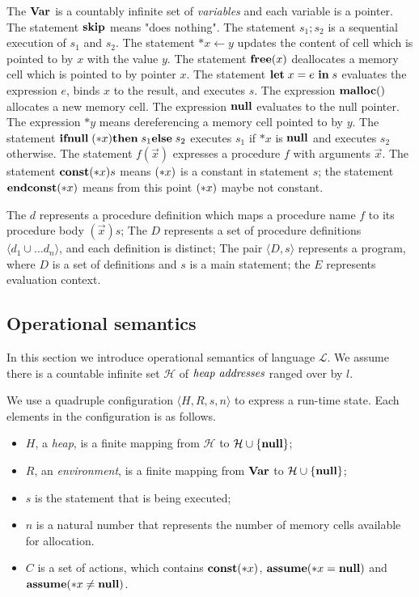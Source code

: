 The \(\mathbf{Var}\) is a countably infinite set of \emph{variables} and each
variable is a pointer. The statement \(\mathbf{skip}\) means "does nothing".
The statement \(s_1;s_2\) is a sequential execution of \(s_1\) and
\(s_2\). The statement \(*x \leftarrow y\) updates the content of cell
which is pointed to by \(x\) with the value \(y\). The statement
\(\mathbf{free}(x)\) deallocates a memory cell which is pointed to by pointer
\(x\). The statement \(\mathbf{let}\; x = e\ \mathbf{in}\; s\) evaluates the expression
\(e\), binds \(x\) to the result, and executes \(s\). The expression
\(\mathbf{malloc}()\) allocates a new memory cell. The expression \(\mathbf{null}\)
evaluates to the null pointer. The expression \(*y\) means
dereferencing a memory cell pointed to by \(y\). The statement
\(\mathbf{ifnull}\;(*x) \mathbf{then}\; s_1 \mathbf{else}\; s_2\) executes \(s_1\) if \(*x\) is
\(\mathbf{null}\) and executes \(s_2\) otherwise. The statement \(f(\vec{x})\)
expresses a procedure \(f\) with arguments \(\vec{x}\). The statement
\(\mathbf{const}(*x) s\) means \((*x)\) is a constant in statement \(s\); the
statement \(\mathbf{endconst}(*x)\) means from this point \((*x)\) maybe not
constant.

The \(d\) represents a procedure definition which maps a procedure
name \(f\) to its procedure body \((\vec{x})s\); The \(D\) represents
a set of procedure definitions \(\langle d_1 \cup\dots d_n \rangle\),
and each definition is distinct; The pair \(\langle D, s \rangle \)
represents a program, where \(D\) is a set of definitions and \(s\) is
a main statement; the \(E\) represents evaluation context.

\subsection{Operational semantics}
\label{sec:languageSemantics}
In this section we introduce operational semantics of language
\(\mathcal{L}\). We assume there is a countable infinite set
\(\mathcal{H}\) of \(\emph{heap addresses}\) ranged over by \(l\).

We use a quadruple configuration \(\langle H, R, s, n \rangle\) to
express a run-time state. Each elements in the configuration is as
follows.

\begin{itemize}
\item \(H\), a \emph{heap}, is a finite mapping from \(\mathcal{H}\)
  to \(\mathcal{H} \cup \{\mathbf{null}\}\);
\item \(R\), an \emph{environment}, is a finite mapping from \(\mathbf{Var}\)
  to \(\mathcal{H} \cup \{\mathbf{null}\}\);
\item \(s\) is the statement that is being executed; 
\item \(n\) is a natural number that represents the number of memory
  cells available for allocation.
\item \(C\) is a set of actions, which contains \(\mathbf{const}(*x)\),
  \(\mathbf{assume}(*x = \mathbf{null})\) and \(\mathbf{assume}(*x \ne \mathbf{null})\).
\end{itemize}

